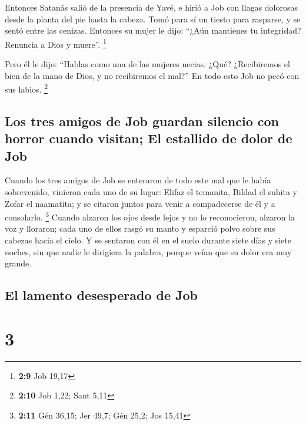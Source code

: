  Entonces Satanás salió de la presencia de Yavé, e hirió a
Job con llagas dolorosas desde la planta del pie hasta la cabeza.
 Tomó para sí un tiesto para rasparse, y se sentó entre
las cenizas.  Entonces su mujer le dijo: ``¿Aún mantienes
tu integridad? Renuncia a Dios y muere''. \footnote{\textbf{2:9} Job
  19,17}

 Pero él le dijo: ``Hablas como una de las mujeres
necias. ¿Qué? ¿Recibiremos el bien de la mano de Dios, y no recibiremos
el mal?'' En todo esto Job no pecó con sus labios. \footnote{\textbf{2:10}
  Job 1,22; Sant 5,11}

\hypertarget{los-tres-amigos-de-job-guardan-silencio-con-horror-cuando-visitan-el-estallido-de-dolor-de-job}{%
\subsection{Los tres amigos de Job guardan silencio con horror cuando
visitan; El estallido de dolor de
Job}\label{los-tres-amigos-de-job-guardan-silencio-con-horror-cuando-visitan-el-estallido-de-dolor-de-job}}

 Cuando los tres amigos de Job se enteraron de todo este
mal que le había sobrevenido, vinieron cada uno de su lugar: Elifaz el
temanita, Bildad el suhita y Zofar el naamatita; y se citaron juntos
para venir a compadecerse de él y a consolarlo. \footnote{\textbf{2:11}
  Gén 36,15; Jer 49,7; Gén 25,2; Jos 15,41}  Cuando
alzaron los ojos desde lejos y no lo reconocieron, alzaron la voz y
lloraron; cada uno de ellos rasgó su manto y esparció polvo sobre sus
cabezas hacia el cielo.  Y se sentaron con él en el suelo
durante siete días y siete noches, sin que nadie le dirigiera la
palabra, porque veían que su dolor era muy grande.

\hypertarget{el-lamento-desesperado-de-job}{%
\subsection{El lamento desesperado de
Job}\label{el-lamento-desesperado-de-job}}

\hypertarget{section-2}{%
\section{3}\label{section-2}}

